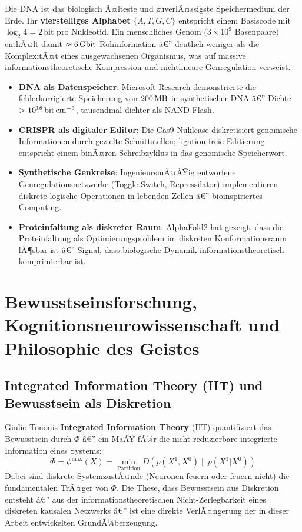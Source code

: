 ﻿\documentclass[12pt,a4paper,titlepage]{report}
\begin{document}
Die DNA ist das biologisch Ã¤lteste und zuverlÃ¤ssigste Speichermedium der Erde.
Ihr \textbf{vierstelliges Alphabet} $\{A, T, G, C\}$ entspricht einem
Basiscode mit $\log_2 4 = 2\,\text{bit}$ pro Nukleotid. Ein menschliches Genom
$(3 \times 10^9$ Basenpaare$)$ enthÃ¤lt damit $\approx \SI{6}{\giga\bit}$ Rohinformation â€”
deutlich weniger als die KomplexitÃ¤t eines ausgewachsenen Organismus, was auf
massive informationstheoretische Kompression und nichtlineare Genregulation verweist.

\begin{itemize}[leftmargin=2em]
    \item \textbf{DNA als Datenspeicher}: Microsoft Research demonstrierte
        die fehlerkorrigierte Speicherung von $\SI{200}{\mega\byte}$ in synthetischer
        DNA â€” Dichte $>\SI{e18}{\bit\per\centi\meter\cubed}$, tausendmal
        dichter als NAND-Flash.
    \item \textbf{CRISPR als digitaler Editor}: Die Cas9-Nuklease diskretisiert
        genomische Informationen durch gezielte Schnittstellen; ligation-freie
        Editierung entspricht einem binÃ¤ren Schreibzyklus in das genomische Speicherwort.
    \item \textbf{Synthetische Genkreise}: IngenieursmÃ¤ÃŸig entworfene
        Genregulationsnetzwerke (Toggle-Switch, Repressilator) implementieren
        diskrete logische Operationen in lebenden Zellen â€” bioinspiriertes Computing.
    \item \textbf{Proteinfaltung als diskreter Raum}: AlphaFold2 hat gezeigt,
        dass die Proteinfaltung als Optimierungsproblem im diskreten Konformationsraum
        lÃ¶sbar ist â€” Signal, dass biologische Dynamik informationstheoretisch
        komprimierbar ist.
\end{itemize}

\section{Bewusstseinsforschung, Kognitionsneurowissenschaft und Philosophie des
Geistes}

\subsection{Integrated Information Theory (IIT) und Bewusstsein als Diskretion}

Giulio Tononis \textbf{Integrated Information Theory} (IIT) quantifiziert das
Bewusstsein durch $\Phi$ â€” ein MaÃŸ fÃ¼r die nicht-reduzierbare integrierte Information
eines Systems:
\[
    \Phi = \phi^{\max}(X) = \min_{\text{Partition}} D(p(X^1,X^0) \| p(X^1|X^0))
\]
Dabei sind diskrete SystemzustÃ¤nde (Neuronen feuern oder feuern nicht) die
fundamentalen TrÃ¤ger von $\Phi$. Die These, dass Bewusstsein aus Diskretion entsteht
â€” aus der informationstheoretischen Nicht-Zerlegbarkeit eines diskreten kausalen
Netzwerks â€” ist eine direkte VerlÃ¤ngerung der in dieser Arbeit entwickelten
GrundÃ¼berzeugung.
\end{document}
